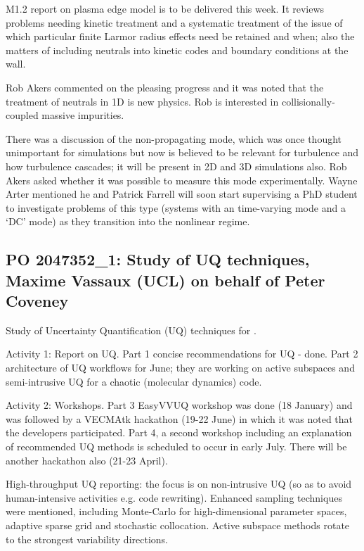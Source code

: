 M1.2 report on plasma edge model is to be delivered this week.  It reviews 
problems needing kinetic treatment and a systematic treatment of the issue of 
which particular finite Larmor radius effects need be retained and when; also 
the matters of including neutrals into kinetic codes and boundary conditions at 
the wall.

Rob Akers commented on the pleasing progress and it was noted that the 
treatment of neutrals in 1D is new physics.  Rob is interested in 
collisionally-coupled massive impurities.

There was a discussion of the non-propagating mode, which was once thought 
unimportant for simulations but now is believed to be relevant for turbulence 
and how turbulence cascades; it will be present in 2D and 3D simulations also.  
Rob Akers asked whether it was possible to measure this mode experimentally.  
Wayne Arter mentioned he and Patrick Farrell will soon start supervising a PhD
student to investigate problems of this type (systems with an time-varying mode and a `DC' mode)
as they transition into the nonlinear regime.
  


\subsection{PO 2047352\_1: Study of UQ techniques, Maxime Vassaux (UCL) on behalf of Peter Coveney}

Study of Uncertainty Quantification (UQ) techniques for \nep.

Activity 1: Report on UQ.  Part 1 concise recommendations for UQ - done.  Part 
2 architecture of UQ workflows for June; they are working on active subspaces and 
semi-intrusive UQ for a chaotic (molecular dynamics) code.

Activity 2: Workshops.  Part 3 EasyVVUQ workshop was done (18 January) and was 
followed by a VECMAtk hackathon (19-22 June) in which it was noted that the 
 developers participated.  Part 4, a second workshop including an 
explanation of recommended UQ methods is scheduled to occur in early July.  
There will be another hackathon also (21-23 April).

High-throughput UQ reporting: the focus is on non-intrusive UQ (so as to avoid 
human-intensive activities e.g. code rewriting).  Enhanced sampling techniques 
were mentioned, including Monte-Carlo for high-dimensional parameter spaces, 
adaptive sparse grid and stochastic collocation.  Active subspace methods 
rotate to the strongest variability directions.

